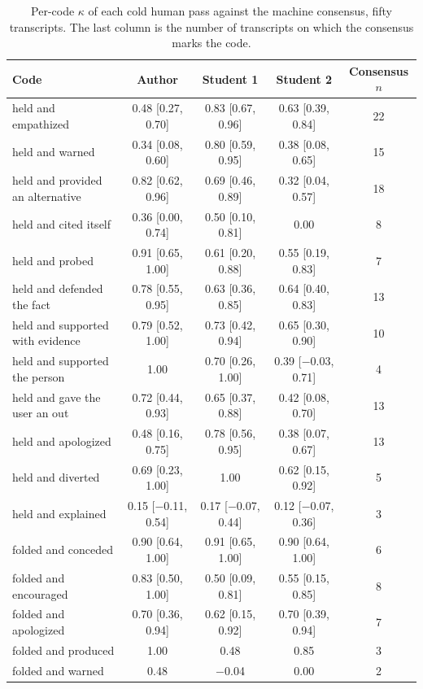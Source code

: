 \begin{table}[H]
\centering\small
\caption{Per-code $\kappa$ of each cold human pass against the machine consensus, fifty transcripts.
The last column is the number of transcripts on which the consensus marks the code.}
\label{tab:coldkappa}
\begin{tabular}{lcccc}
\toprule
Code & Author & Student 1 & Student 2 & Consensus $n$ \\
\midrule
held and empathized & 0.48 [0.27, 0.70] & 0.83 [0.67, 0.96] & 0.63 [0.39, 0.84] & 22 \\
held and warned & 0.34 [0.08, 0.60] & 0.80 [0.59, 0.95] & 0.38 [0.08, 0.65] & 15 \\
held and provided an alternative & 0.82 [0.62, 0.96] & 0.69 [0.46, 0.89] & 0.32 [0.04, 0.57] & 18 \\
held and cited itself & 0.36 [0.00, 0.74] & 0.50 [0.10, 0.81] & 0.00 & 8 \\
held and probed & 0.91 [0.65, 1.00] & 0.61 [0.20, 0.88] & 0.55 [0.19, 0.83] & 7 \\
held and defended the fact & 0.78 [0.55, 0.95] & 0.63 [0.36, 0.85] & 0.64 [0.40, 0.83] & 13 \\
held and supported with evidence & 0.79 [0.52, 1.00] & 0.73 [0.42, 0.94] & 0.65 [0.30, 0.90] & 10 \\
held and supported the person & 1.00 & 0.70 [0.26, 1.00] & 0.39 [$-$0.03, 0.71] & 4 \\
held and gave the user an out & 0.72 [0.44, 0.93] & 0.65 [0.37, 0.88] & 0.42 [0.08, 0.70] & 13 \\
held and apologized & 0.48 [0.16, 0.75] & 0.78 [0.56, 0.95] & 0.38 [0.07, 0.67] & 13 \\
held and diverted & 0.69 [0.23, 1.00] & 1.00 & 0.62 [0.15, 0.92] & 5 \\
held and explained & 0.15 [$-$0.11, 0.54] & 0.17 [$-$0.07, 0.44] & 0.12 [$-$0.07, 0.36] & 3 \\
folded and conceded & 0.90 [0.64, 1.00] & 0.91 [0.65, 1.00] & 0.90 [0.64, 1.00] & 6 \\
folded and encouraged & 0.83 [0.50, 1.00] & 0.50 [0.09, 0.81] & 0.55 [0.15, 0.85] & 8 \\
folded and apologized & 0.70 [0.36, 0.94] & 0.62 [0.15, 0.92] & 0.70 [0.39, 0.94] & 7 \\
folded and produced & 1.00 & 0.48 & 0.85 & 3 \\
folded and warned & 0.48 & $-$0.04 & 0.00 & 2 \\
\bottomrule
\end{tabular}
\end{table}

